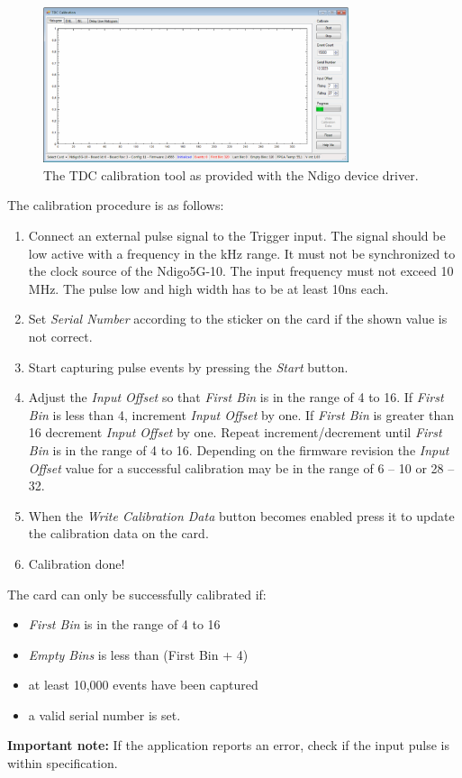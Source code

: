 		\begin{figure}[ht]
			\begin{center}
				\includegraphics[width=0.8\textwidth]{figures/Calib.pdf}
				\caption{\label{fig:Calib}The TDC calibration tool as provided with the Ndigo device driver.}
			\end{center}
		\end{figure}
		
		The calibration procedure is as follows:
		
		\begin{enumerate}
			\item Connect an external pulse signal to the Trigger input. The signal should be low active with a frequency in the kHz range. It must not be synchronized to the clock source of the Ndigo5G-10. The input frequency must not exceed 10 MHz. The pulse low and high width has to be at least 10ns each.
			\item Set \textit{Serial Number} according to the sticker on the card if the shown value is not correct.
			\item Start capturing pulse events by pressing the \textit{Start} button.
			\item Adjust the \textit{Input Offset} so that \textit{First Bin} is in the range of 4 to 16. If \textit{First Bin} is less than 4, increment \textit{Input Offset} by one. If \textit{First Bin} is greater than 16 decrement \textit{Input Offset} by one. Repeat increment/decrement until \textit{First Bin} is in the range of 4 to 16. Depending on 
the firmware revision the \textit{Input Offset} value for a successful calibration may be in the range of 6 – 10 or 28 – 32.
			\item When the \textit{Write Calibration Data} button becomes enabled press it to update the calibration data on the card.
			\item Calibration done!
		\end{enumerate}
		
		The card can only be successfully calibrated if:
		
		\begin{itemize}
			\item \textit{First Bin} is in the range of 4 to 16
			\item \textit{Empty Bins} is less than (First Bin + 4)
			\item at least 10,000 events have been captured
			\item a valid serial number is set.
		\end{itemize}
		
		\textbf{Important note:} If the application reports an error, check if the input pulse is within specification.
